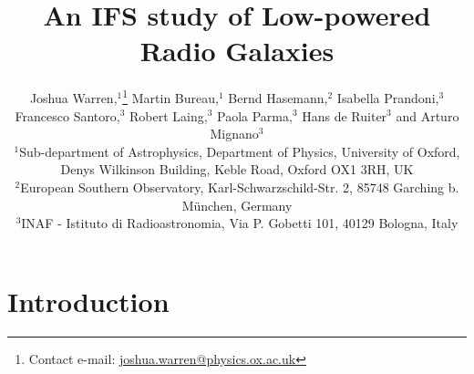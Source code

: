 \documentclass[fleqn,usenatbib,useAMS]{mnras}
\title{An IFS study of Low-powered Radio Galaxies}
\author[J. Warren et al.]{
Joshua Warren,$^{1}$\thanks{Contact e-mail: \href{mailto:joshua.warren@physics.ox.ac.uk}{joshua.warren@physics.ox.ac.uk}}
Martin Bureau,$^{1}$
Bernd Hasemann,$^{2}$
Isabella Prandoni,$^{3}$ \newauthor
Francesco Santoro,$^{3}$
Robert Laing,$^{3}$
Paola Parma,$^{3}$
Hans de Ruiter$^{3}$
and Arturo Mignano$^{3}$
\\
$^{1}$Sub-department of Astrophysics, Department of Physics, University of Oxford, Denys Wilkinson Building, Keble Road, Oxford OX1 3RH, UK\\
$^{2}$European Southern Observatory, Karl-Schwarzschild-Str. 2, 85748 Garching b. München, Germany\\
$^{3}$INAF - Istituto di Radioastronomia, Via P. Gobetti 101, 40129 Bologna, Italy}
\begin{document}
\maketitle


\begin{abstract}

\end{abstract}



\section{Introduction}
	\label{sec:intro}

\end{document}
